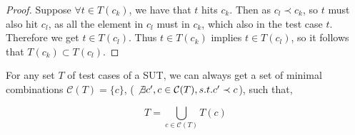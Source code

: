 \documentclass{sig-alternate}
\begin{document}
\begin{proof}
Suppose $ \forall t \in T(c_{k})$, we have that $t$ hits $c_{k}$. Then as $c_{l} \prec c_{k}$, so $t$ must also hit $c_{l}$, as all the element in $c_{l}$ must in $c_{k}$, which also in the test case $t$. Therefore we get $t \in T(c_{l})$. Thus $t \in T(c_{k})$ implies $t \in T(c_{l})$, so it follows that $T(c_{k}) \subset T(c_{l})$.
\end{proof}


\begin{proposition}

For any set $T$ of test cases of a SUT, we can always get a set of minimal combinations $\mathcal{C}(T) = \{c \}$, ( $\not\exists c', c \in \mathcal{C}(T), s.t. c' \prec  c $),  such that,

\begin{displaymath} T  =  \bigcup_{c \in \mathcal{C}(T)} T(c) \end{displaymath}

\end{proposition}
\end{document}
